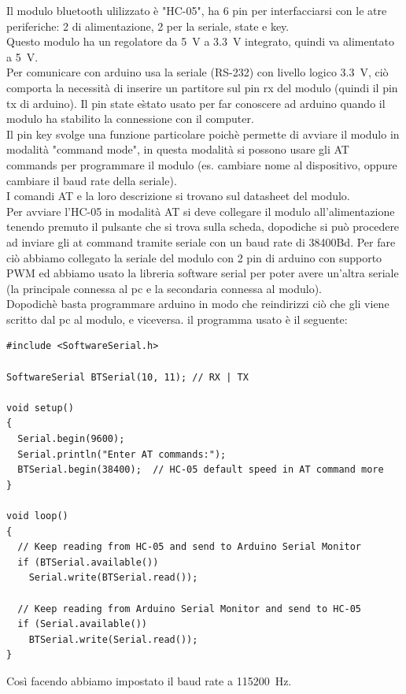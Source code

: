\documentclass[10pt,a4paper]{article}
\begin{document}
Il modulo bluetooth ulilizzato \`e "HC-05", ha 6 pin per interfacciarsi con le atre periferiche: 2 di alimentazione, 2 per la seriale, state e key. 
\\
Questo modulo ha un regolatore da \SI{5}{\volt} a \SI{3.3}{\volt} integrato, quindi va alimentato a \SI{5}{\volt}.
\\
Per comunicare con arduino usa la seriale (RS-232) con livello logico \SI{3.3}{\volt}, ci\`o comporta la necessit\`a di inserire un partitore sul pin rx del modulo (quindi il pin tx di arduino). 
Il pin state e\` stato usato per far conoscere ad arduino quando il modulo ha stabilito la connessione con il computer. 
\\
Il pin key svolge una funzione particolare poich\`e permette di avviare il modulo in modalit\`a "command mode", in questa modalit\`a si possono usare gli AT commands per programmare il modulo (es. cambiare nome al dispositivo, oppure cambiare il baud rate della seriale).
\\
I comandi AT e la loro descrizione si trovano sul datasheet del modulo. 
\\
Per avviare l'HC-05 in modalit\`a AT si deve collegare il modulo all'alimentazione tenendo premuto il pulsante che si trova sulla scheda, dopodiche si pu\`o procedere ad inviare gli at command tramite seriale con un baud rate di 38400Bd. Per fare ci\`o abbiamo collegato la seriale del modulo con 2  pin di arduino con supporto PWM ed abbiamo usato la libreria software serial per poter avere un'altra seriale (la principale connessa al pc e la secondaria connessa al modulo). 
\\
Dopodich\`e basta programmare arduino in modo che reindirizzi ci\`o che gli viene scritto dal pc al modulo, e viceversa. il programma usato \`e il seguente:
%
\begin{lstlisting}[style=myArduino]
#include <SoftwareSerial.h>

SoftwareSerial BTSerial(10, 11); // RX | TX

void setup()
{
  Serial.begin(9600);
  Serial.println("Enter AT commands:");
  BTSerial.begin(38400);  // HC-05 default speed in AT command more
}

void loop()
{
  // Keep reading from HC-05 and send to Arduino Serial Monitor
  if (BTSerial.available())
    Serial.write(BTSerial.read());

  // Keep reading from Arduino Serial Monitor and send to HC-05
  if (Serial.available())
    BTSerial.write(Serial.read());
}
\end{lstlisting}
Cos\`i facendo abbiamo impostato il baud rate a \SI{115200}{\hertz}.
\end{document}

